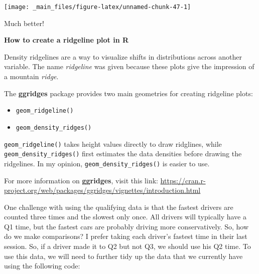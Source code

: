\documentclass[
]{book}
\providecommand{\tightlist}{%
  \setlength{\itemsep}{0pt}\setlength{\parskip}{0pt}}
\begin{document}
\begin{center}\texttt{[image: \_main\_files/figure-latex/unnamed-chunk-47-1]} \end{center}

Much better!

\begin{blackbox}

\begin{center}
\textbf{How to create a ridgeline plot in R}

\end{center}

Density ridgelines are a way to visualize shifts in distributions across another variable. The name \emph{ridgeline} was given because these plots give the impression of a mountain \emph{ridge}.

The \textbf{ggridges} package provides two main geometries for creating ridgeline plots:

\begin{itemize}
\tightlist
\item
  \texttt{geom\_ridgeline()}
\item
  \texttt{geom\_density\_ridges()}
\end{itemize}

\texttt{geom\_ridgeline()} takes height values directly to draw ridglines, while \texttt{geom\_density\_ridges()} first estimates the data densities before drawing the ridgelines. In my opinion, \texttt{geom\_density\_ridges()} is easier to use.

For more information on \textbf{ggridges}, visit this link: \url{https://cran.r-project.org/web/packages/ggridges/vignettes/introduction.html}

\end{blackbox}

One challenge with using the qualifying data is that the fastest drivers are counted three times and the slowest only once. All drivers will typically have a Q1 time, but the fastest cars are probably driving more conservatively. So, how do we make comparisons? I prefer taking each driver's fastest time in their last session. So, if a driver made it to Q2 but not Q3, we should use his Q2 time. To use this data, we will need to further tidy up the data that we currently have using the following code:
\end{document}
